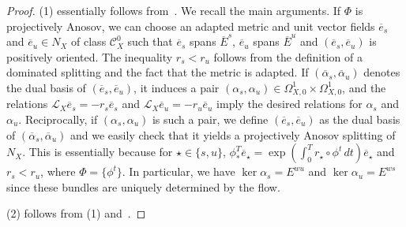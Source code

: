 \documentclass[letterpaper, 11pt]{article}
\numberwithin{equation}{section}
\begin{document}
\begin{proof} (1) essentially follows from~\cite[Proposition 3.15]{H22a}. We recall the main arguments. If $\Phi$ is projectively Anosov, we can choose an adapted metric and unit vector fields $\overline{e}_s$ and $\overline{e}_u \in N_X$ of class $\mathcal{C}^0_X$ such that $\overline{e}_s$ spans $\overline{E}^s$, $\overline{e}_u$ spans $\overline{E}^u$ and $(\overline{e}_s, \overline{e}_u)$ is positively oriented. The inequality $r_s < r_u$ follows from the definition of a dominated splitting and the fact that the metric is adapted. If $(\overline{\alpha}_s,\overline{\alpha}_u)$ denotes the dual basis of $(\overline{e}_s, \overline{e}_u)$, it induces a pair $(\alpha_s, \alpha_u) \in \Omega^1_{X,0} \times \Omega^1_{X,0}$, and the relations $\mathcal{L}_X \overline{e}_s = - r_s \overline{e}_s$ and $\mathcal{L}_X \overline{e}_u = - r_u \overline{e}_u$ imply the desired relations for $\alpha_s$ and $\alpha_u$. Reciprocally, if $(\alpha_s, \alpha_u)$ is such a pair, we define $(\overline{e}_s, \overline{e}_u)$ as the dual basis of $(\overline{\alpha}_s,\overline{\alpha}_u)$ and we easily check that it yields a projectively Anosov splitting of $N_X$. This is essentially because for $\star \in \{s,u\}$, $\phi^T_* \overline{e}_{\star} = \exp \left( \int^T_0 r_{\star} \circ \phi^t \, dt \right) \overline{e}_{\star}$ and $r_s < r_u$, where $\Phi = \{\phi^t\}$. In particular, we have $\ker \alpha_s = E^{wu}$ and $\ker \alpha_u = E^{ws}$ since these bundles are uniquely determined by the flow.

(2) follows from (1) and~\cite[Proposition 3.17]{H22a}.


\end{proof}
\end{document}
